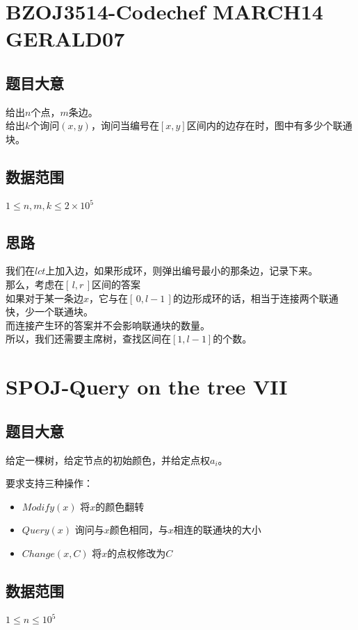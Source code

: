 \documentclass{ctexart}
\numberwithin{equation}{section}
\begin{document}
\begin{flushleft}
  \section{BZOJ3514-Codechef MARCH14 GERALD07}
  \subsection{题目大意}
  给出$n$个点，$m$条边。\\
  给出$k$个询问$(x,y)$，询问当编号在$[x,y]$区间内的边存在时，图中有多少个联通块。\\
  \subsection{数据范围}
  $1\le n,m,k\le 2\times 10^5$
  \subsection{思路}
  我们在$lct$上加入边，如果形成环，则弹出编号最小的那条边，记录下来。\\
  那么，考虑在$[\, l,r\, ]$区间的答案\\
  如果对于某一条边$x$，它与在$[\, 0,l-1\, ]$的边形成环的话，相当于连接两个联通快，少一个联通块。\\
  而连接产生环的答案并不会影响联通块的数量。\\
  所以，我们还需要主席树，查找区间在$[1,l-1]$的个数。\\
  \newpage 

  \section{SPOJ-Query on the tree VII}
  \subsection{题目大意}
  给定一棵树，给定节点的初始颜色，并给定点权$a_i$。

  要求支持三种操作：
  \begin{itemize}
  \item $Modify(x)$ 将$x$的颜色翻转
  \item $Query(x)$ 询问与$x$颜色相同，与$x$相连的联通块的大小
  \item $Change(x,C)$ 将$x$的点权修改为$C$
  \end{itemize}
  \subsection{数据范围}
  $1\le n \le 10^5$

\end{flushleft}
\end{document}
